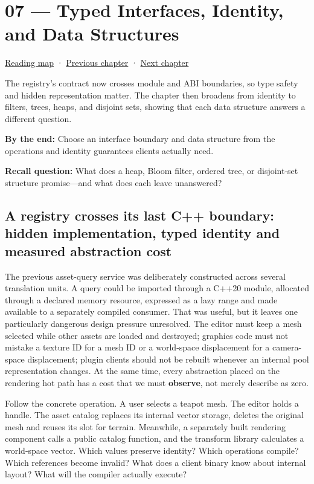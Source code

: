 \hypertarget{01-foundations-i-ch007}{}
\chapter{07 --- Typed Interfaces, Identity, and Data Structures}\label{01-foundations-i-ch007-typed-interfaces-identity-and-data-structures}

\hyperref[volume-reading-map]{Reading map} · \hyperref[01-foundations-i-ch006]{Previous chapter} · \hyperref[01-foundations-i-ch008]{Next chapter}

The registry's contract now crosses module and ABI boundaries, so type safety and hidden representation matter. The chapter then broadens from identity to filters, trees, heaps, and disjoint sets, showing that each data structure answers a different question.

\textbf{By the end:} Choose an interface boundary and data structure from the operations and identity guarantees clients actually need.

\textbf{Recall question:} What does a heap, Bloom filter, ordered tree, or disjoint-set structure promise---and what does each leave unanswered?

\section{A registry crosses its last C++ boundary: hidden implementation, typed identity and measured abstraction cost}\label{01-foundations-i-ch007-a-registry-crosses-its-last-c-boundary-hidden-implementation-typed-identity-and-measured-abstraction-cost}

The previous asset-query service was deliberately constructed across several translation units. A query could be imported through a C++20 module, allocated through a declared memory resource, expressed as a lazy range and made available to a separately compiled consumer. That was useful, but it leaves one particularly dangerous design pressure unresolved. The editor must keep a mesh selected while other assets are loaded and destroyed; graphics code must not mistake a texture ID for a mesh ID or a world-space displacement for a camera-space displacement; plugin clients should not be rebuilt whenever an internal pool representation changes. At the same time, every abstraction placed on the rendering hot path has a cost that we must \textbf{observe}, not merely describe as zero.

Follow the concrete operation. A user selects a teapot mesh. The editor holds a handle. The asset catalog replaces its internal vector storage, deletes the original mesh and reuses its slot for terrain. Meanwhile, a separately built rendering component calls a public catalog function, and the transform library calculates a world-space vector. Which values preserve identity? Which operations compile? Which references become invalid? What does a client binary know about internal layout? What will the compiler actually execute?

